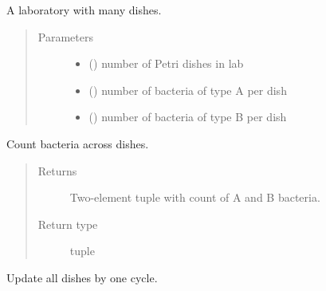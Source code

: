 \documentclass[a4paper,10pt,english]{sphinxmanual}
\begin{document}
\begin{fulllineitems}
\label{\detokenize{sim_and_lab:biolab.laboratory.Lab}}
A laboratory with many dishes.
\begin{quote}\begin{description}
\item[{Parameters}] \leavevmode\begin{itemize}
\item {} 
 () \textendash{} number of Petri dishes in lab

\item {} 
 () \textendash{} number of bacteria of type A per dish

\item {} 
 () \textendash{} number of bacteria of type B per dish

\end{itemize}

\end{description}\end{quote}

\begin{fulllineitems}
\label{\detokenize{sim_and_lab:biolab.laboratory.Lab.bacteria_counts}}
Count bacteria across dishes.
\begin{quote}\begin{description}
\item[{Returns}] \leavevmode
Two-element tuple with count of A and B bacteria.

\item[{Return type}] \leavevmode
tuple

\end{description}\end{quote}

\end{fulllineitems}


\begin{fulllineitems}
\label{\detokenize{sim_and_lab:biolab.laboratory.Lab.cycle}}
Update all dishes by one cycle.

\end{fulllineitems}


\end{fulllineitems}
\end{document}

